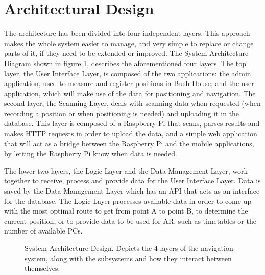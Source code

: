 \section{Architectural Design}
The architecture has been divided into four independent layers. This approach makes the whole system easier to manage, and very simple to replace or change parts of it, if they need to be extended or improved. The System Architecture Diagram shown in figure \ref{fig:system-architecture-design}, describes the aforementioned four layers. 
The top layer, the User Interface Layer, is composed of the two applications: the admin application, used to measure and register positions in Bush House, and the user application, which will make use of the data for positioning and navigation. 
The second layer, the Scanning Layer, deals with scanning data when requested (when recording a position or when positioning is needed) and uploading it in the database. This layer is composed of a Raspberry Pi that scans, parses results and makes HTTP requests in order to upload the data, and a simple web application that will act as a bridge between the Raspberry Pi and the mobile applications, by letting the Raspberry Pi know when data is needed.

The lower two layers, the Logic Layer and the Data Management Layer, work together to receive, process and provide data for the User Interface Layer. Data is saved by the Data Management Layer which has an API that acts as an interface for the database. The Logic Layer processes available data in order to come up with the most optimal route to get from point A to point B, to determine the current position, or to provide data to be used for AR, such as timetables or the number of available PCs.

\begin{figure}[H]
    \centering
    \centering
    \caption{System Architecture Design. Depicts the 4 layers of the navigation system, along with the subsystems and how they interact between themselves.}
    \label{fig:system-architecture-design}
\end{figure}

